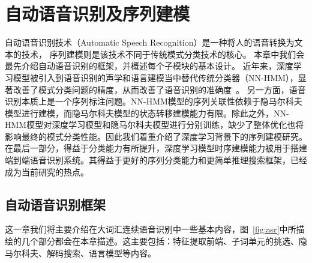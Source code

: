 
\chapter{自动语音识别及序列建模}
\label{chap:intro}

自动语音识别技术（Automatic Speech Recognition）是一种将人的语音转换为文本的技术，
序列建模则是该技术不同于传统模式分类技术的核心。
%
本章中我们会最先介绍自动语音识别的框架，并概述每个子模块的基本设计。
近年来，深度学习模型被引入到语音识别的声学和语言建模当中替代传统分类器（NN-HMM），显著改善了模式分类问题的精度，从而改善了语音识别的准确度~\cite{CD-DNN-HMM-dahl2012,DNN4ASR-hinton2012}。 另一方面，语音识别本质上是一个序列标注问题。NN-HMM模型的序列关联性依赖于隐马尔科夫模型进行建模，而隐马尔科夫模型的状态转移建模能力有限。除此之外，NN-HMM模型对深度学习模型和隐马尔科夫模型进行分别训练，缺少了整体优化也将影响最终的模式分类性能。因此我们着重介绍了深度学习背景下的序列建模研究。
在最后一部分，得益于分类能力有所提升，深度学习模型时序建模能力被用于搭建端到端语音识别系统。其得益于更好的序列分类能力和更简单推理搜索框架，已经成为当前研究的热点。


\section{自动语音识别框架}
\label{chap:intro-asr}

这一章我们将主要介绍在大词汇连续语音识别中一些基本内容，图~\ref{fig:asr}中所描绘的几个部分都会在本章描述。这主要包括：特征提取前端、子词单元的挑选、隐马尔科夫、解码搜索、语言模型等内容。

